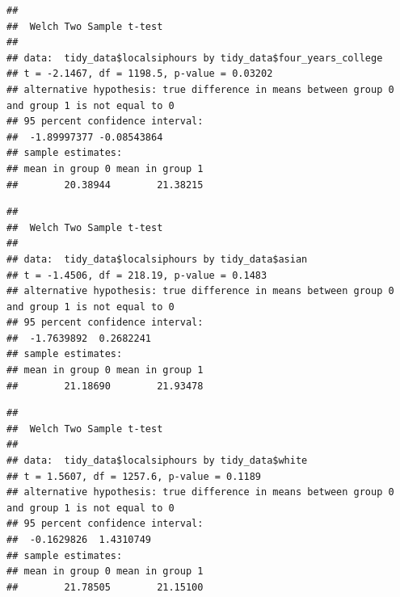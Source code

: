 \documentclass[
  11 pt,
]{article}
\newenvironment{Shaded}{\begin{snugshade}}{\end{snugshade}}
\newcommand{\AttributeTok}[1]{\textcolor[rgb]{0.77,0.63,0.00}{#1}}
\newcommand{\CommentTok}[1]{\textcolor[rgb]{0.56,0.35,0.01}{\textit{#1}}}
\newcommand{\ConstantTok}[1]{\textcolor[rgb]{0.00,0.00,0.00}{#1}}
\newcommand{\FunctionTok}[1]{\textcolor[rgb]{0.00,0.00,0.00}{#1}}
\newcommand{\NormalTok}[1]{#1}
\newcommand{\SpecialCharTok}[1]{\textcolor[rgb]{0.00,0.00,0.00}{#1}}
\begin{document}
\begin{verbatim}
## 
##  Welch Two Sample t-test
## 
## data:  tidy_data$localsiphours by tidy_data$four_years_college
## t = -2.1467, df = 1198.5, p-value = 0.03202
## alternative hypothesis: true difference in means between group 0 and group 1 is not equal to 0
## 95 percent confidence interval:
##  -1.89997377 -0.08543864
## sample estimates:
## mean in group 0 mean in group 1 
##        20.38944        21.38215
\end{verbatim}

\begin{Shaded}
\end{Shaded}

\begin{verbatim}
## 
##  Welch Two Sample t-test
## 
## data:  tidy_data$localsiphours by tidy_data$asian
## t = -1.4506, df = 218.19, p-value = 0.1483
## alternative hypothesis: true difference in means between group 0 and group 1 is not equal to 0
## 95 percent confidence interval:
##  -1.7639892  0.2682241
## sample estimates:
## mean in group 0 mean in group 1 
##        21.18690        21.93478
\end{verbatim}

\begin{Shaded}
\end{Shaded}

\begin{verbatim}
## 
##  Welch Two Sample t-test
## 
## data:  tidy_data$localsiphours by tidy_data$white
## t = 1.5607, df = 1257.6, p-value = 0.1189
## alternative hypothesis: true difference in means between group 0 and group 1 is not equal to 0
## 95 percent confidence interval:
##  -0.1629826  1.4310749
## sample estimates:
## mean in group 0 mean in group 1 
##        21.78505        21.15100
\end{verbatim}
\end{document}
